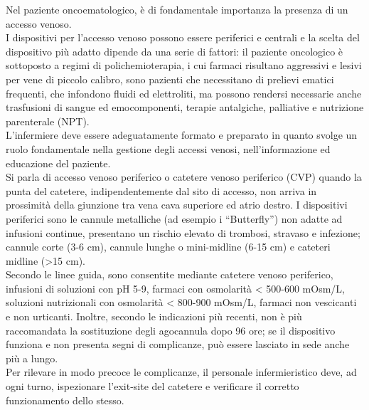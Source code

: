 Nel paziente oncoematologico, è di fondamentale importanza la presenza di un accesso venoso.\\ I dispositivi per 
l’accesso venoso possono essere periferici e centrali e la scelta del dispositivo più adatto dipende da una serie di 
fattori: il paziente oncologico è sottoposto a regimi di polichemioterapia, i cui farmaci risultano aggressivi e 
lesivi per vene di piccolo calibro, sono pazienti che necessitano di prelievi ematici frequenti, che infondono fluidi 
ed elettroliti, ma possono rendersi necessarie anche trasfusioni di sangue ed emocomponenti, terapie antalgiche, 
palliative e nutrizione parenterale (NPT).\\
L’infermiere deve essere adeguatamente formato e preparato in quanto svolge un ruolo fondamentale nella gestione 
degli accessi venosi, nell’informazione ed educazione del paziente.\\
Si parla di accesso venoso periferico o catetere venoso periferico (CVP) quando la punta del catetere, 
indipendentemente dal sito di accesso, non arriva in prossimità della giunzione tra vena cava superiore ed atrio destro. 
I dispositivi periferici sono le cannule metalliche (ad esempio i “Butterfly”) non adatte ad infusioni continue, 
presentano un rischio elevato di trombosi, stravaso e infezione; cannule corte (3-6 cm), cannule lunghe o 
mini-midline (6-15 cm) e cateteri midline (>15 cm)\cite{GAVECELTCVC}.\\
Secondo le linee guida, sono consentite mediante catetere venoso periferico, infusioni di soluzioni con pH 5-9, 
farmaci con osmolarità < 500-600 mOsm/L, soluzioni nutrizionali con osmolarità < 800-900 mOsm/L, farmaci non 
vescicanti e non urticanti. Inoltre, secondo le indicazioni più recenti, non è più raccomandata la sostituzione 
degli agocannula dopo 96 ore; se il dispositivo funziona e non presenta segni di complicanze, 
può essere lasciato in sede anche più a lungo\cite{GAVECELTCVC}.\\
Per rilevare in modo precoce le complicanze, il personale infermieristico deve, ad ogni turno, ispezionare 
l'exit-site del catetere e verificare il corretto funzionamento dello stesso\cite{GAVECELTracc2021}.\\

